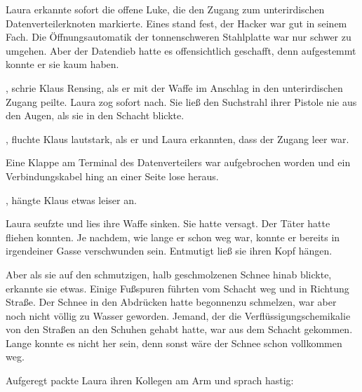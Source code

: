 \par

Laura erkannte sofort die offene Luke, die den Zugang zum unterirdischen Datenverteilerknoten markierte. Eines stand fest, der Hacker war gut in seinem Fach. Die Öffnungsautomatik der tonnenschweren Stahlplatte war nur schwer zu umgehen. Aber der Datendieb hatte es offensichtlich geschafft, denn aufgestemmt konnte er sie kaum haben.

\par

, schrie Klaus Rensing, als er mit der Waffe im Anschlag in den unterirdischen Zugang peilte. Laura zog sofort nach. Sie ließ den Suchstrahl ihrer Pistole nie aus den Augen, als sie in den Schacht blickte.

\par

, fluchte Klaus lautstark, als er und Laura erkannten, dass der Zugang leer war.

\par

Eine Klappe am Terminal des Datenverteilers war aufgebrochen worden und ein Verbindungskabel hing an einer Seite lose heraus.

\par

, hängte Klaus etwas leiser an. 

\par

Laura seufzte und lies ihre Waffe sinken. Sie hatte versagt. Der Täter hatte fliehen konnten. Je nachdem, wie lange er schon weg war, konnte er bereits in irgendeiner Gasse verschwunden sein. Entmutigt ließ sie ihren Kopf hängen.

\par

Aber als sie auf den schmutzigen, halb geschmolzenen Schnee hinab blickte, erkannte sie etwas. Einige Fußspuren führten vom Schacht weg und in Richtung Straße. Der Schnee in den Abdrücken hatte begonnenzu schmelzen, war aber noch nicht völlig zu Wasser geworden. Jemand, der die Verflüssigungschemikalie von den Straßen an den Schuhen gehabt hatte, war aus dem Schacht gekommen. Lange konnte es nicht her sein, denn sonst wäre der Schnee schon vollkommen weg.

\par

Aufgeregt packte Laura ihren Kollegen am Arm und sprach hastig: 

